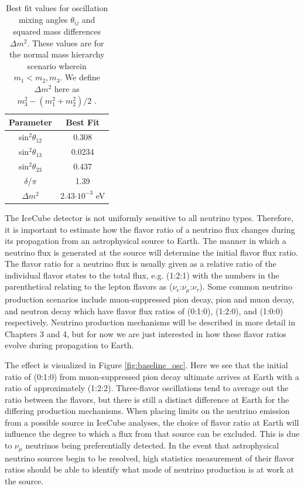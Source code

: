 \documentclass{gatech-thesis}
\begin{document}
\begin{table}[h]
\caption[Best Fit Neutrino Oscillation Parameters]{Best fit values for oscillation mixing angles $\theta_{ij}$ and squared mass differences $\Delta m^{2}$. These values are for the normal mass hierarchy scenario wherein $m_1 < m_2 , m_3$. We define $\Delta m^{2}$ here as $m_{3}^2 - (m_1^2 + m_2^2)/2$ \cite{PhysRevD.89.093018}.\label{tab:osc_param}}
\begin{center}
\begin{tabular}{cc}
\toprule
\textbf{Parameter} &\textbf{ Best Fit}\\
\midrule
sin$^2 \theta_{12}$ & 0.308\\
sin$^2 \theta_{13}$ & 0.0234\\
sin$^2 \theta_{23}$ & 0.437\\
$\delta / \pi$ & 1.39 \\
$\Delta m^2$ & 2.43$\cdot 10^{-3}$ eV\\
\hline
\end{tabular}
\end{center}
\end{table}

The IceCube detector is not uniformly sensitive to all neutrino types. Therefore, it is important to estimate how the flavor ratio of a neutrino flux changes during its propagation from an astrophysical source to Earth. The manner in which a neutrino flux is generated at the source will determine the initial flavor flux ratio. The flavor ratio for a neutrino flux is usually given as a relative ratio of the individual flavor states to the total flux, e.g. (1:2:1) with the numbers in the parenthetical relating to the lepton flavors as ($\nu_e$:$\nu_{\mu}$:$\nu_{\tau}$). Some common neutrino production scenarios include muon-suppressed pion decay, pion and muon decay, and neutron decay which have flavor flux ratios of (0:1:0), (1:2:0), and (1:0:0) respectively. Neutrino production mechanisms will be described in more detail in Chapters 3 and 4, but for now we are just interested in how these flavor ratios evolve during propagation to Earth. 

The effect is visualized in Figure \ref{fig:baseline_osc}. Here we see that the initial ratio of (0:1:0) from muon-suppressed pion decay ultimate arrives at Earth with a ratio of approximately (1:2:2). Three-flavor oscillations tend to average out the ratio between the flavors, but there is still a distinct difference at Earth for the differing production mechanisms. When placing limits on the neutrino emission from a possible source in IceCube analyses, the choice of flavor ratio at Earth will influence the degree to which a flux from that source can be excluded. This is due to $\nu_{\mu}$ neutrinos being preferentially detected. In the event that astrophysical neutrino sources begin to be resolved, high statistics measurement of their flavor ratios should be able to identify what mode of neutrino production is at work at the source.
\end{document}
